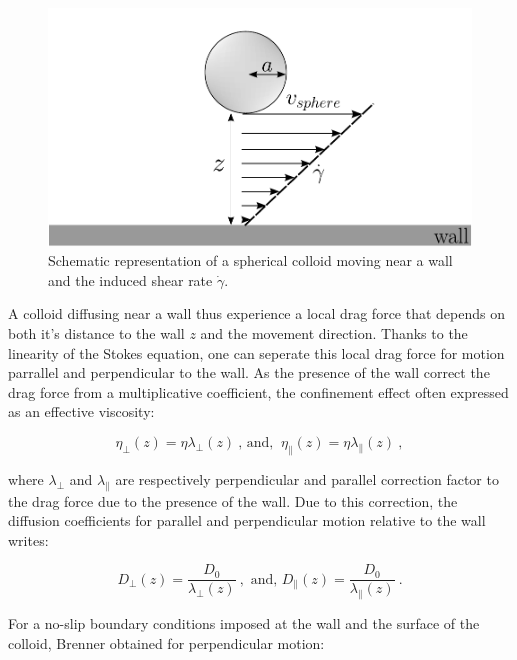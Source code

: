 \begin{figure}[ht]
	\centering
	\includegraphics{02_body/chapter3/images/draw_shear/shear.pdf}
	\caption{Schematic representation of a spherical colloid moving near a wall and the induced shear rate $\dot{\gamma}$.} 
	\label{fig.shear}
\end{figure}

A colloid diffusing near a wall thus experience a local drag force that depends on both it's distance to the wall $z$ and the movement direction. Thanks to the linearity of the Stokes equation, one can seperate this local drag force for motion parrallel and perpendicular to the wall. As the presence of the wall correct the drag force from a multiplicative coefficient, the confinement effect often expressed as an effective viscosity:

\begin{equation}
	\eta _\bot (z) = {\eta}{\lambda _ \bot (z)}  ~ \text{, and, } ~\eta _\parallel (z) =  {\eta}{\lambda _ \parallel (z)}~,
\end{equation}

where $\lambda _\bot$ and $\lambda _\parallel$ are respectively perpendicular and parallel correction factor to the drag force due to the presence of the wall. Due to this correction, the diffusion coefficients for parallel and perpendicular motion relative to the wall writes:

\begin{equation}
	D_\bot (z) =  \frac{D_0}{\lambda _\bot (z)}  ~, \text{ and, } D_\parallel (z) = \frac{D_0}{ \lambda_\parallel (z)} ~.
\end{equation}
 
For a no-slip boundary conditions imposed at the wall and the surface of the colloid, Brenner \cite{brenner_slow_1961} obtained for perpendicular motion:


